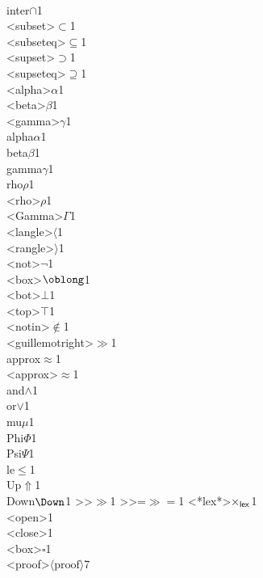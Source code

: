 {  {\\inter}{{$\cap$}}1
  {\\<subset>}{{$\subset$}}1
  {\\<subseteq>}{{$\subseteq$}}1
  {\\<supset>}{{$\supset$}}1
  {\\<supseteq>}{{$\supseteq$}}1
  {\\<alpha>}{{$\alpha$}}1
  {\\<beta>}{{$\beta$}}1
  {\\<gamma>}{{$\gamma$}}1
  {\\alpha}{{$\alpha$}}1
  {\\beta}{{$\beta$}}1
  {\\gamma}{{$\gamma$}}1
  {\\rho}{{$\rho$}}1
  {\\<rho>}{{$\rho$}}1
  {\\<Gamma>}{{$\Gamma$}}1
  {\\<langle>}{{$\langle$}}1
  {\\<rangle>}{{$\rangle$}}1
  {\\<not>}{{$\neg$}}1
  {\\<box>}{{$\oblong$}}1
  {\\<bot>}{{$\bot$}}1
  {\\<top>}{{$\top$}}1
  {\\<notin>}{{$\notin$}}1
  {\\<guillemotright>}{{$\gg$}}1
  {\\approx}{$\approx$}1
  {\\<approx>}{$\approx$}1
  {\\and}{$\wedge$}1
  {\\or}{$\vee$}1
  {\\mu}{$\mu$}1
  {\\Phi}{{$\Phi$}}1
  {\\Psi}{{$\Psi$}}1
  {\\le}{{$\le$}}1
  {\\Up}{{$\Uparrow$}}1
  {\\Down}{{$\Down$}}1
  {>>}{{$\gg$}}1
  {>>=}{{${\gg}{=}$}}1
  {<*lex*>}{{$\times_{\sf lex}$}}1
  {\\<open>}{{\rm\guilsinglleft}}1
  {\\<close>}{{\rm\guilsinglright}}1
  {\\<box>}{{$\square$}}1
  {\\<proof>}{{\color{darkgray}$\langle\text{proof}\rangle$}}7
}

\newcommand*{\rightcomment}[1]{\hfill\color{darkgray} --- #1}%

\newcommand{\is}{\lstinline[language=isabelle]}%, breaklines=true]}
\newcommand{\cs}{\lstinline[language=C++]}
\newcommand{\q}[1]{\mbox{\guilsinglleft{#1}\hspace{-.0pt}\guilsinglright}}
